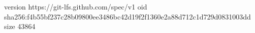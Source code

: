 version https://git-lfs.github.com/spec/v1
oid sha256:f4b55bf237c28b09800ee3486bc42d19f2f1360e2a88d712c1d729d0831003dd
size 43864
